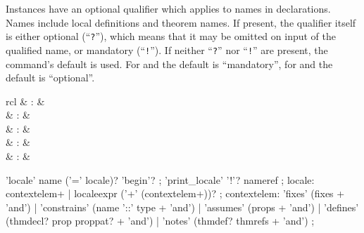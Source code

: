 \begin{isabellebody}
\begin{isamarkuptext}
  Instances have an optional qualifier which applies to names in
  declarations.  Names include local definitions and theorem names.
  If present, the qualifier itself is either optional
  (``\texttt{?}''), which means that it may be omitted on input of the
  qualified name, or mandatory (``\texttt{!}'').  If neither
  ``\texttt{?}'' nor ``\texttt{!}'' are present, the command's default
  is used.  For \hyperlink{command.interpretation}{\mbox{}} and \hyperlink{command.interpret}{\mbox{}}
  the default is ``mandatory'', for \hyperlink{command.locale}{\mbox{}} and \hyperlink{command.sublocale}{\mbox{}} the default is ``optional''.%
\end{isamarkuptext}%
\isamarkuptrue%
%
\isamarkuptrue%
%
\begin{isamarkuptext}%
\begin{matharray}{rcl}
    \hypertarget{command.locale}{\hyperlink{command.locale}{\mbox{}}} & : &  \\
    \hypertarget{command.print-locale}{\hyperlink{command.print-locale}{\mbox{}}}\isa{{\isachardoublequote}\isactrlsup {\isacharasterisk}{\isachardoublequote}} & : &  \\
    \hypertarget{command.print-locales}{\hyperlink{command.print-locales}{\mbox{}}}\isa{{\isachardoublequote}\isactrlsup {\isacharasterisk}{\isachardoublequote}} & : &  \\
    \hypertarget{method.intro-locales}{\hyperlink{method.intro-locales}{\mbox{}}} & : &  \\
    \hypertarget{method.unfold-locales}{\hyperlink{method.unfold-locales}{\mbox{}}} & : &  \\
  \end{matharray}

  \begin{rail}
    'locale' name ('=' locale)? 'begin'?
    ;
    'print\_locale' '!'? nameref
    ;
    locale: contextelem+ | localeexpr ('+' (contextelem+))?
    ;
    contextelem:
    'fixes' (fixes + 'and')
    | 'constrains' (name '::' type + 'and')
    | 'assumes' (props + 'and')
    | 'defines' (thmdecl? prop proppat? + 'and')
    | 'notes' (thmdef? thmrefs + 'and')
    ;
  \end{rail}


\end{isamarkuptext}
\end{isabellebody}
